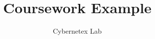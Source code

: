 \title{Coursework Example}
\author{Cybernetex Lab}

\begin{titlepage}
	
	\maketitle
	
\end{titlepage}